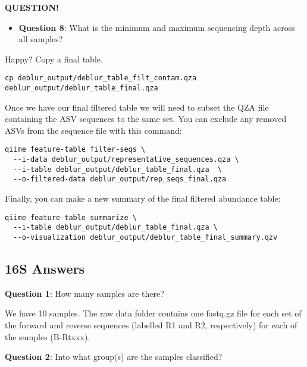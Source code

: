 \documentclass[
]{book}
\providecommand{\tightlist}{%
  \setlength{\itemsep}{0pt}\setlength{\parskip}{0pt}}
\newenvironment{bluebox}{
  \definecolor{shadecolor}{RGB}{172, 210, 237}
  \color{white}
  \begin{shaded}}
 {\end{shaded}}
\begin{document}
\begin{bluebox}

\begin{center}
\textbf{QUESTION!}

\end{center}

\begin{itemize}
\tightlist
\item
  \textbf{Question 8}: What is the minimum and maximum sequencing depth across all samples?
\end{itemize}

\end{bluebox}

Happy? Copy a final table.

\begin{verbatim}
cp deblur_output/deblur_table_filt_contam.qza deblur_output/deblur_table_final.qza
\end{verbatim}

Once we have our final filtered table we will need to subset the QZA file containing the ASV sequences to the same set. You can exclude any removed ASVs from the sequence file with this command:

\begin{verbatim}
qiime feature-table filter-seqs \
  --i-data deblur_output/representative_sequences.qza \
  --i-table deblur_output/deblur_table_final.qza  \
  --o-filtered-data deblur_output/rep_seqs_final.qza
\end{verbatim}

Finally, you can make a new summary of the final filtered abundance table:

\begin{verbatim}
qiime feature-table summarize \
  --i-table deblur_output/deblur_table_final.qza \
  --o-visualization deblur_output/deblur_table_final_summary.qzv
\end{verbatim}

\subsection{16S Answers}\label{s-answers}

\textbf{Question 1}: How many samples are there?

We have 10 samples. The raw data folder contains one fastq.gz file for each set of the forward and reverse sequences (labelled R1 and R2, respectively) for each of the samples (B-Rtxxx).

\textbf{Question 2}: Into what group(s) are the samples classified?
\end{document}
